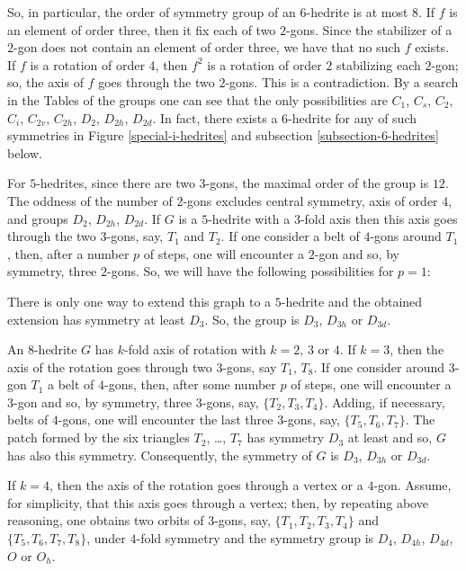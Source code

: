 \documentclass[12pt]{article}
\begin{document}
So, in particular, the order of symmetry group of an $6$-hedrite is at
most $8$. If $f$ is an element of order three, then it fix each of two
$2$-gons. Since the stabilizer of a $2$-gon does not contain an element
of order three, we have that no such $f$ exists. If $f$ is a rotation of
order $4$, then $f^2$ is a rotation of order $2$ stabilizing each $2$-gon;
so, the axis of $f$ goes through the two $2$-gons. This is a contradiction.
By a search in the Tables of the groups one can see that the only possibilities are $C_1$, $C_s$, $C_2$, $C_i$, $C_{2v}$, $C_{2h}$, $D_2$, $D_{2h}$, $D_{2d}$. In fact, there exists a $6$-hedrite for any of such symmetries in Figure \ref{special-i-hedrites} and subsection \ref{subsection-6-hedrites} below.

For $5$-hedrites, since there are two $3$-gons, the maximal order of the group is $12$. The oddness of the number of $2$-gons excludes central symmetry, axis of order $4$, and groups $D_2$, $D_{2h}$, $D_{2d}$.
If $G$ is a $5$-hedrite with a $3$-fold axis then this axis goes through
the two $3$-gons, say, $T_1$ and $T_2$. If one consider a belt of $4$-gons
around $T_1$, then, after a number $p$ of steps, one will encounter a
$2$-gon and so, by symmetry, three $2$-gons. So, we will have the 
following possibilities for $p=1$:

\begin{center}
\epsfxsize=90mm
\end{center}

There is only one way to extend this graph to a $5$-hedrite and the obtained extension has symmetry at least $D_3$. So, the group is $D_{3}$, $D_{3h}$ or $D_{3d}$.

An $8$-hedrite $G$ has $k$-fold axis of rotation with $k=2$, $3$ or $4$. 
If $k=3$, then the axis of the rotation goes through two $3$-gons,
say $T_1$, $T_8$. If one consider around $3$-gon $T_1$ a belt of 
$4$-gons, then, after some number $p$ of steps, one will encounter a 
$3$-gon and so, by symmetry, three $3$-gons, say, $\{T_2,T_3,T_4\}$. 
Adding, if necessary, belts of $4$-gons, one will encounter the last 
three $3$-gons, say, $\{T_5,T_6,T_7\}$. The patch formed by the six
triangles $T_2$, \dots, $T_7$ has symmetry $D_3$ at least and so, 
$G$ has also this symmetry. Consequently, the symmetry of $G$ is $D_3$,
$D_{3h}$ or $D_{3d}$.

If $k=4$, then the axis of the rotation goes through a vertex or
a $4$-gon. Assume, for simplicity, that this axis goes through a
vertex; then, by repeating above reasoning, one obtains two orbits of
$3$-gons, say, $\{T_1, T_2, T_3, T_4\}$ and $\{T_5, T_6, T_7, T_8\}$,
under $4$-fold symmetry and the symmetry group is $D_4$, $D_{4h}$,
$D_{4d}$, $O$ or $O_h$.
\end{document}
